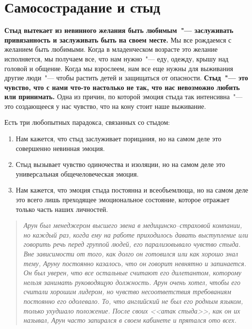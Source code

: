 
\chapter{Самосострадание и стыд} \label{Self-Compassion_and_Shame}

\textbf{Стыд вытекает из невинного желания быть любимым~"--- заслуживать привязанность и заслуживать быть на своем месте.} Мы все рождаемся с желанием быть любимыми. Когда в младенческом возрасте это желание исполняется, мы получаем все, что нам нужно~"--- еду, одежду, крышу над головой и общение\cite{89}. Когда мы взрослеем, нам все еще нужны для выживания другие люди~"--- чтобы растить детей и защищаться от опасности. \textbf{Стыд~"--- это чувство, что с нами что-то настолько не так, что нас невозможно любить или принимать.} Одна из причин, по которой эмоция стыда так интенсивна~"--- это создающееся у нас чувство, что на кону стоит наше выживание.

\vspace{2ex}

Есть три любопытных парадокса, связанных со стыдом:
\begin{enumerate}
	\item Нам кажется, что стыд заслуживает порицания, но на самом деле это совершенно невинная эмоция.	
	\item Стыд вызывает чувство одиночества и изоляции, но на самом деле это универсальная общечеловеческая эмоция.
	\item Нам кажется, что эмоция стыда постоянна и всеобъемлюща, но на самом деле это всего лишь преходящее эмоциональное состояние, которое отражает только часть наших личностей.
\end{enumerate}

\begin{quotation}
	\textit{
		Арун был менеджером высшего звена в медицинско--страховой компании, но каждый раз, когда ему на работе приходилось давать выступление или говорить речь перед группой людей, его парализовывало чувство стыда. Вне зависимости от того, как долго он готовился или как хорошо знал тему, Аруну постоянно казалось, что он говорит невнятно и запинается. Он был уверен, что все остальные считают его дилетантом, которому нельзя занимать руководящую должность. Арун очень хотел, чтобы его считали хорошим лидером, но чувство несоответствия требованиям постоянно его одолевало. То, что английский не был его родным языком, только ухудшало положение. После своих <<атак стыда>>, как он их называл, Арун часто запирался в своем кабинете и прятался ото всех.
	}
\end{quotation}

